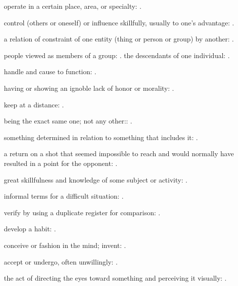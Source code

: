   operate in a certain place, area, or specialty: .

  control (others or oneself) or influence skillfully, usually to one's advantage:   .

  a relation of constraint of one entity (thing or person or group) by another: .

  people viewed as members of a group: . the descendants of one individual:   .

  handle and cause to function:   .

  having or showing an ignoble lack of honor or morality:   .

  keep at a distance:   .

  being the exact same one; not any other::   .

  something determined in relation to something that includes it:   .

  a return on a shot that seemed impossible to reach and would normally have resulted in a point for the opponent: .

  great skillfulness and knowledge of some subject or activity:   .

  informal terms for a difficult situation:   .

  verify by using a duplicate register for comparison: .

  develop a habit: .

  conceive or fashion in the mind; invent: .

  accept or undergo, often unwillingly:   .

  the act of directing the eyes toward something and perceiving it visually:   .

